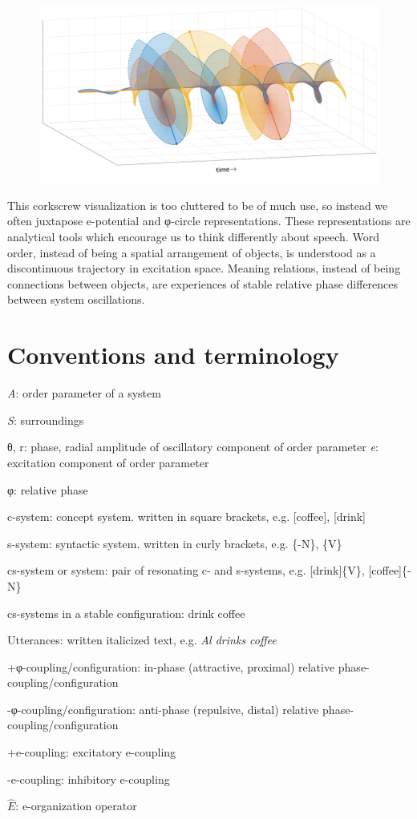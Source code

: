  
\begin{figure}
\includegraphics[width=\textwidth]{figures/Tilsen-img28.png}
\caption{\missingcaption}
\label{fig:2:21}
\end{figure}
 

  This corkscrew visualization is too cluttered to be of much use, so instead we often juxtapose e-potential and φ{}-circle representations. These representations are analytical tools which encourage us to think differently about speech. Word order, instead of being a spatial arrangement of objects, is understood as a discontinuous trajectory in excitation space. Meaning relations, instead of being connections between objects, are experiences of stable relative phase differences between system oscillations.

\section{Conventions and terminology}

\textit{A}: order parameter of a system

\textit{S}: surroundings

θ, r: phase, radial amplitude of oscillatory component of order parameter
\textit{e}: excitation component of order parameter

φ: relative phase

c-system: concept system. written in square brackets, e.g. [coffee], [drink]

s-system: syntactic system. written in curly brackets, e.g. \{-N\}, \{V\}

cs-system or system: pair of resonating c- and s-systems, e.g. [drink]\{V\}, [coffee]\{-N\}

cs-systems in a stable configuration: {\textbar}drink coffee{\textbar}

Utterances: written italicized text, e.g. \textit{Al drinks coffee}

+φ-coupling/configuration: in-phase (attractive, proximal) relative phase-coupling/configuration

{}-φ-coupling/configuration: anti-phase (repulsive, distal) relative phase-coupling/configuration

+e-coupling: excitatory e-coupling

{}-e-coupling: inhibitory e-coupling

 $\widehat {{E}}$: e-organization operator
